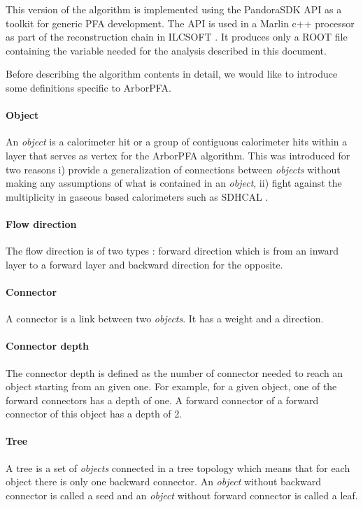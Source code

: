 \documentclass[cits]{JINST}
\begin{document}
This version of the algorithm is implemented using the PandoraSDK API as a toolkit for generic PFA development. The API is used in a Marlin c++ processor as part of the reconstruction chain in ILCSOFT \cite{ilcsoft}. It produces only a ROOT \cite{root} file containing the variable needed for the analysis described in this document.

Before describing the algorithm contents in detail, we would like to introduce some definitions specific to ArborPFA.

\paragraph*{Object} An \textit{object} is a calorimeter hit or a group of contiguous calorimeter hits within a layer that serves as vertex for the ArborPFA algorithm. This was introduced for two reasons i) provide a generalization of connections between \textit{objects} without making any assumptions of what is contained in an \textit{object}, ii) fight against the multiplicity in gaseous based calorimeters such as SDHCAL \cite{sdhcal-paper}.

\paragraph*{Flow direction} The flow direction is of two types : forward direction which is from an inward layer to a forward layer and backward direction for the opposite.

\paragraph*{Connector} A connector is a link between two \textit{objects}. It has a weight and a direction.

\paragraph*{Connector depth} The connector depth is defined as the number of connector needed to reach an object starting from an given one. For example, for a given object, one of the forward connectors has a depth of one. A forward connector of a forward connector of this object has a depth of 2.

\paragraph*{Tree} A tree is a set of \textit{objects} connected in a tree topology which means that for each object there is only one backward connector. An \textit{object} without backward connector is called a seed and an \textit{object} without forward connector is called a leaf.
\end{document}
